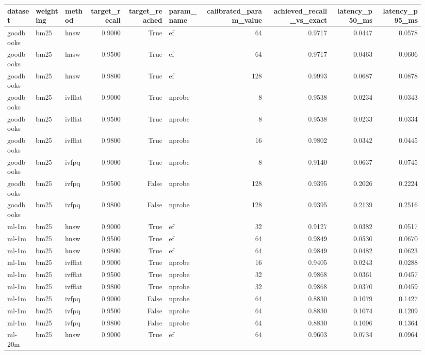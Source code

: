 \begin{tabular}{lllrrlrrrr}
\toprule
dataset & weighting & method & target_recall & target_reached & param_name & calibrated_param_value & achieved_recall_vs_exact & latency_p50_ms & latency_p95_ms \\
\midrule
goodbooks & bm25 & hnsw & 0.9000 & True & ef & 64 & 0.9717 & 0.0447 & 0.0578 \\
goodbooks & bm25 & hnsw & 0.9500 & True & ef & 64 & 0.9717 & 0.0463 & 0.0606 \\
goodbooks & bm25 & hnsw & 0.9800 & True & ef & 128 & 0.9993 & 0.0687 & 0.0878 \\
goodbooks & bm25 & ivfflat & 0.9000 & True & nprobe & 8 & 0.9538 & 0.0234 & 0.0343 \\
goodbooks & bm25 & ivfflat & 0.9500 & True & nprobe & 8 & 0.9538 & 0.0233 & 0.0334 \\
goodbooks & bm25 & ivfflat & 0.9800 & True & nprobe & 16 & 0.9802 & 0.0342 & 0.0445 \\
goodbooks & bm25 & ivfpq & 0.9000 & True & nprobe & 8 & 0.9140 & 0.0637 & 0.0745 \\
goodbooks & bm25 & ivfpq & 0.9500 & False & nprobe & 128 & 0.9395 & 0.2026 & 0.2224 \\
goodbooks & bm25 & ivfpq & 0.9800 & False & nprobe & 128 & 0.9395 & 0.2139 & 0.2516 \\
ml-1m & bm25 & hnsw & 0.9000 & True & ef & 32 & 0.9127 & 0.0382 & 0.0517 \\
ml-1m & bm25 & hnsw & 0.9500 & True & ef & 64 & 0.9849 & 0.0530 & 0.0670 \\
ml-1m & bm25 & hnsw & 0.9800 & True & ef & 64 & 0.9849 & 0.0482 & 0.0623 \\
ml-1m & bm25 & ivfflat & 0.9000 & True & nprobe & 16 & 0.9405 & 0.0243 & 0.0288 \\
ml-1m & bm25 & ivfflat & 0.9500 & True & nprobe & 32 & 0.9868 & 0.0361 & 0.0457 \\
ml-1m & bm25 & ivfflat & 0.9800 & True & nprobe & 32 & 0.9868 & 0.0370 & 0.0459 \\
ml-1m & bm25 & ivfpq & 0.9000 & False & nprobe & 64 & 0.8830 & 0.1079 & 0.1427 \\
ml-1m & bm25 & ivfpq & 0.9500 & False & nprobe & 64 & 0.8830 & 0.1074 & 0.1209 \\
ml-1m & bm25 & ivfpq & 0.9800 & False & nprobe & 64 & 0.8830 & 0.1096 & 0.1364 \\
ml-20m & bm25 & hnsw & 0.9000 & True & ef & 64 & 0.9603 & 0.0734 & 0.0964 \\

\end{tabular}
